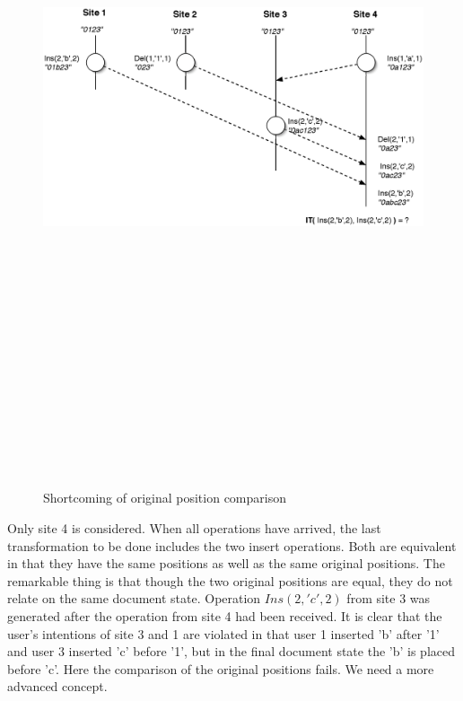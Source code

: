\begin{itemize}
\begin{figure}[H]
\centering
\includegraphics[height=8.56in,width=4.92in]{../../images/algo-impl/transform_ins_ins_lsp.eps}
\caption{Shortcoming of original position comparison}
\label{Shortcoming of original position comparison}
\end{figure}

Only site 4 is considered. When all operations have arrived, the last transformation to be done includes the two insert operations. Both are equivalent in that they have the same positions as well as the same original positions. The remarkable thing is that though the two original positions are equal, they do not relate on the same document state. Operation $Ins(2,'c',2)$ from site 3 was generated after the operation from site 4 had been received. It is clear that the user's intentions of site 3 and 1 are violated in that user 1 inserted 'b' after '1' and user 3 inserted 'c' before '1', but in the final document state the 'b' is placed before 'c'. Here the comparison of the original positions fails. We need a more advanced concept. 


\end{itemize}
